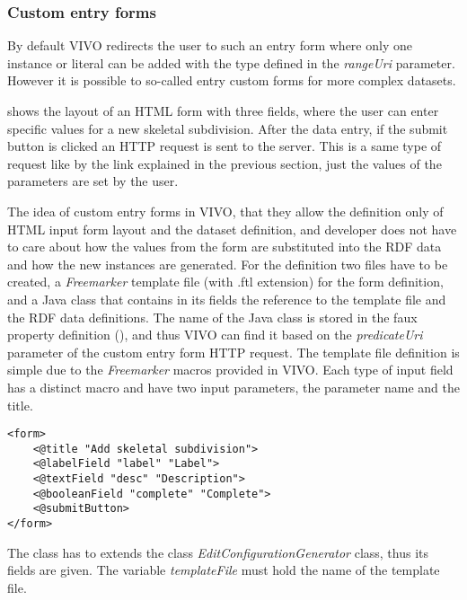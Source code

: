 \subsubsection{Custom entry forms} \label{vivoCef}

By default VIVO redirects the user to such an entry form where only one instance or literal can be added with the type defined in the \textit{rangeUri} parameter. However it is possible to so-called entry custom forms for more complex datasets.


 shows the layout of an HTML form with three fields, where the user can enter specific values for a new skeletal subdivision. After the data entry, if the submit button is clicked an HTTP request is sent to the server. This is a same type of request like by the link explained in the previous section, just the values of the parameters are set by the user.

The idea of custom entry forms in VIVO, that they allow the definition only of HTML input form layout and the dataset definition, and developer does not have to care about how the values from the form are substituted into the RDF data and how the new instances are generated. For the definition two files have to be created, a \textit{Freemarker}  template file (with .ftl extension) for the form definition, and a Java class that contains in its fields the reference to the template file and the RDF data definitions. The name of the Java class is stored in the faux property definition (), and thus VIVO can find it based on the \textit{predicateUri} parameter of the custom entry form HTTP request.
The template file definition is simple due to the \textit{Freemarker} macros provided in VIVO. Each type of input field has a distinct macro and have two input parameters, the parameter name and the title.

\begin{lstlisting}[captionpos=b, caption= subdivision.ftl, label=skullJSON, belowskip=1em, aboveskip=2em,
basicstyle=\footnotesize,frame=single]
<form>
	<@title "Add skeletal subdivision">
	<@labelField "label" "Label">
	<@textField	"desc" "Description">
	<@booleanField "complete" "Complete">
	<@submitButton>
</form>	
\end{lstlisting}

The class has to extends the class \textit{EditConfigurationGenerator} class, thus its fields are given. The variable \textit{templateFile} must hold the name of the template file.

